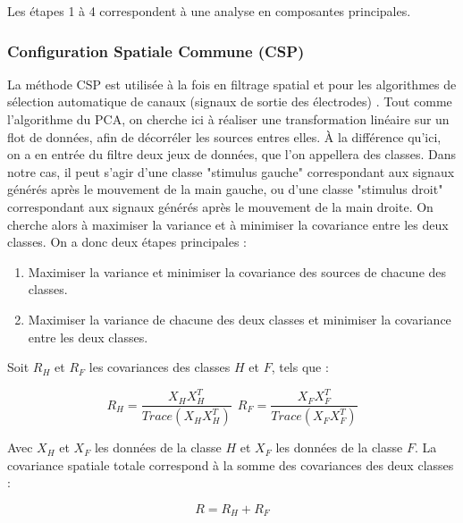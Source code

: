 Les étapes 1 à 4 correspondent à une analyse en composantes principales.

\subsubsection{Configuration Spatiale Commune (CSP)}
\label{Subsubsecton : 4.CSP}
La méthode CSP est utilisée à la fois en filtrage spatial et pour les algorithmes de sélection automatique de canaux (signaux de sortie des électrodes) \cite{CSP} \cite{Lotte}. Tout comme l'algorithme du PCA, on cherche ici à réaliser une transformation linéaire sur un flot de données, afin de décorréler les sources entres elles. À la différence qu'ici, on a en entrée du filtre deux jeux de données, que l'on appellera des classes. Dans notre cas, il peut s'agir d'une classe "stimulus gauche" correspondant aux signaux générés après le mouvement de la main gauche, ou d'une classe "stimulus droit" correspondant aux signaux générés après le mouvement de la main droite. On cherche alors à maximiser la variance et à minimiser la covariance entre les deux classes. On a donc deux étapes principales : 
\smallbreak
\begin{enumerate}
	\item Maximiser la variance et minimiser la covariance des sources de chacune des classes. 
	\smallbreak
	\item Maximiser la variance de chacune des deux classes et minimiser la covariance entre les deux classes.  
\end{enumerate}

Soit $R_H$ et $R_F$ les covariances des classes $H$ et $F$, tels que :

\begin{equation}
	R_H = \frac{X_H X^T_H}{Trace(X_H X^T_H)} \ \ R_F = \frac{X_F X^T_F}{Trace(X_F X^T_F)}
\end{equation}

Avec $X_H$ et $X_F$ les données de la classe $H$ et $X_F$ les données de la classe $F$. 
La covariance spatiale totale correspond à la somme des covariances des deux classes : 

\begin{equation}
	R = R_H + R_F 
\end{equation}

